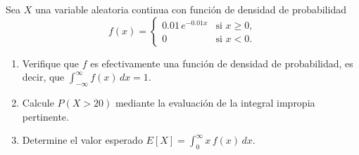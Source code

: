 \begin{prob}[Probabilidad]
Sea $X$ una variable aleatoria continua con función de densidad de
probabilidad
\[
    f(x) =
    \begin{cases}
        0.01\,e^{-0.01x} & \text{si } x \geq 0, \\
        0 & \text{si } x < 0.
    \end{cases}
\]
\begin{enumerate}
    \item Verifique que $f$ es efectivamente una función de densidad de
          probabilidad, es decir, que $\displaystyle\int_{-\infty}^{\infty} f(x)\,dx = 1$.
    \item Calcule $P(X > 20)$ mediante la evaluación de la integral
          impropia pertinente.
    \item Determine el valor esperado $E[X] = \displaystyle\int_{0}^{\infty} x\,f(x)\,dx$.
\end{enumerate}
\end{prob}


